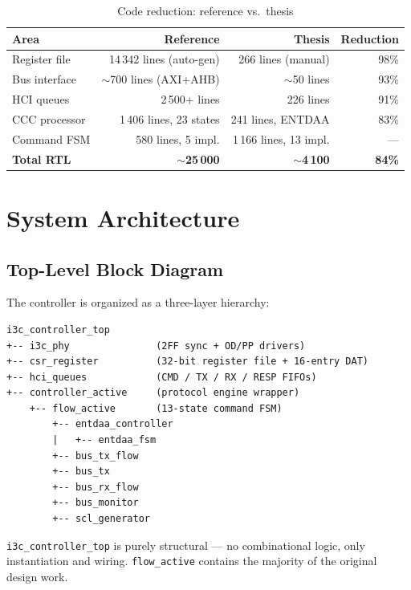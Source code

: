 \documentclass[12pt, a4paper, oneside]{report}
\newcommand{\file}[1]{\texttt{#1}}
\newcommand{\module}[1]{\texttt{#1}}
\begin{document}
\begin{table}[H]
\centering
\caption{Code reduction: reference vs.\ thesis}
\label{tab:code_reduction}
\begin{tabular}{lrrr}
\toprule
\textbf{Area} & \textbf{Reference} & \textbf{Thesis} & \textbf{Reduction} \\
\midrule
Register file  & 14\,342 lines (auto-gen) & 266 lines (manual) & 98\% \\
Bus interface  & $\sim$700 lines (AXI+AHB) & $\sim$50 lines       & 93\% \\
HCI queues     & 2\,500+ lines            & 226 lines             & 91\% \\
CCC processor  & 1\,406 lines, 23 states  & 241 lines, ENTDAA    & 83\% \\
Command FSM    & 580 lines, 5 impl.       & 1\,166 lines, 13 impl.& --- \\
\midrule
\textbf{Total RTL} & \textbf{$\sim$25\,000} & \textbf{$\sim$4\,100} & \textbf{84\%} \\
\bottomrule
\end{tabular}
\end{table}

\chapter{System Architecture}

\section{Top-Level Block Diagram}

The controller is organized as a three-layer hierarchy:

\begin{lstlisting}[style=plain, caption={Top-level module hierarchy}]
i3c_controller_top
+-- i3c_phy               (2FF sync + OD/PP drivers)
+-- csr_register          (32-bit register file + 16-entry DAT)
+-- hci_queues            (CMD / TX / RX / RESP FIFOs)
+-- controller_active     (protocol engine wrapper)
    +-- flow_active       (13-state command FSM)
        +-- entdaa_controller
        |   +-- entdaa_fsm
        +-- bus_tx_flow
        +-- bus_tx
        +-- bus_rx_flow
        +-- bus_monitor
        +-- scl_generator
\end{lstlisting}

\file{i3c\_controller\_top} is purely structural --- no combinational logic, only
instantiation and wiring. \module{flow\_active} contains the majority of the original
design work.
\end{document}

